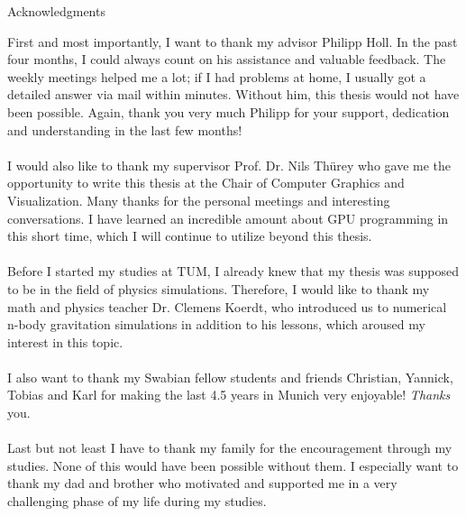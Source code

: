 \thispagestyle{empty}

\vspace*{20mm}

\begin{center}
{ Acknowledgments}
\end{center}

\vspace{10mm}
First and most importantly, I want to thank my advisor Philipp Holl. In the past four months, I could always count on his assistance and valuable feedback. The weekly meetings helped me a lot; if I had problems at home, I usually got a detailed answer via mail within minutes. Without him, this thesis would not have been possible. Again, thank you very much Philipp for your support, dedication and understanding in the last few months! \\\\
I would also like to thank my supervisor Prof. Dr. Nils Thürey who gave me the opportunity to write this thesis at the Chair of Computer Graphics and Visualization. Many thanks for the personal meetings and interesting conversations. I have learned an incredible amount about GPU programming in this short time, which I will continue to utilize beyond this thesis.\\\\
Before I started my studies at TUM, I already knew that my thesis was supposed to be in the field of physics simulations. Therefore, I would like to thank my math and physics teacher Dr. Clemens Koerdt, who introduced us to numerical n-body gravitation simulations in addition to his lessons, which aroused my interest in this topic.\\\\
I also want to thank my Swabian fellow students and friends Christian, Yannick, Tobias and Karl for making the last 4.5 years in Munich very enjoyable! \textit{Thanks} you.\\\\
Last but not least I have to thank my family for the encouragement through my studies. None of this would have been possible without them. I especially want to thank my dad and brother who motivated and supported me in a very challenging phase of my life during my studies.
\cleardoublepage{}
